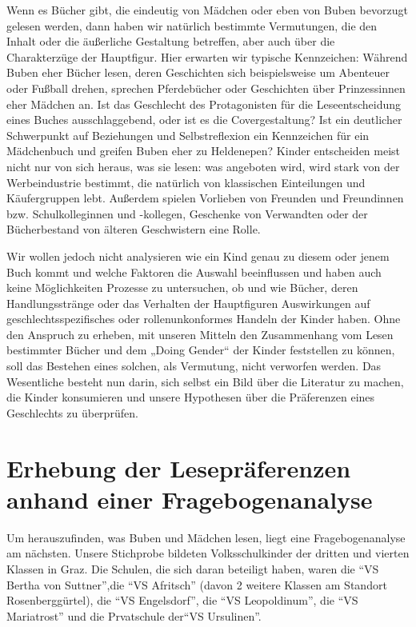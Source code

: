 Wenn es Bücher gibt, die eindeutig von Mädchen oder eben von Buben
bevorzugt gelesen werden, dann haben wir natürlich bestimmte
Vermutungen, die den Inhalt oder die äußerliche Gestaltung betreffen,
aber auch über die Charakterzüge der Hauptfigur. Hier erwarten wir
typische Kennzeichen: Während Buben eher Bücher lesen, deren Geschichten
sich beispielsweise um Abenteuer oder Fußball drehen, sprechen
Pferdebücher oder Geschichten über Prinzessinnen eher Mädchen an. Ist
das Geschlecht des Protagonisten für die Leseentscheidung eines Buches
ausschlaggebend, oder ist es die Covergestaltung? Ist ein deutlicher
Schwerpunkt auf Beziehungen und Selbstreflexion ein Kennzeichen für ein
Mädchenbuch und greifen Buben eher zu Heldenepen? Kinder entscheiden
meist nicht nur von sich heraus, was sie lesen: was angeboten wird, wird
stark von der Werbeindustrie bestimmt, die natürlich von klassischen
Einteilungen und Käufergruppen lebt. Außerdem spielen Vorlieben von
Freunden und Freundinnen bzw. Schulkolleginnen und -kollegen, Geschenke
von Verwandten oder der Bücherbestand von älteren Geschwistern eine
Rolle.

Wir wollen jedoch nicht analysieren wie ein Kind genau zu diesem oder
jenem Buch kommt und welche Faktoren die Auswahl beeinflussen und haben
auch keine Möglichkeiten Prozesse zu untersuchen, ob und wie Bücher,
deren Handlungsstränge oder das Verhalten der Hauptfiguren Auswirkungen
auf geschlechtsspezifisches oder rollenunkonformes Handeln der Kinder
haben. Ohne den Anspruch zu erheben, mit unseren Mitteln den
Zusammenhang vom Lesen bestimmter Bücher und dem „Doing Gender`` der
Kinder feststellen zu können, soll das Bestehen eines solchen, als
Vermutung, nicht verworfen werden. Das Wesentliche besteht nun darin,
sich selbst ein Bild über die Literatur zu machen, die Kinder
konsumieren und unsere Hypothesen über die Präferenzen eines Geschlechts
zu überprüfen.

\section{Erhebung der Lesepräferenzen anhand einer Fragebogenanalyse}

Um herauszufinden, was Buben und Mädchen lesen, liegt eine
Fragebogenanalyse am nächsten. Unsere Stichprobe bildeten
Volksschulkinder der dritten und vierten Klassen in Graz. Die Schulen,
die sich daran beteiligt haben, waren die ``VS Bertha von Suttner'',die
``VS Afritsch'' (davon 2 weitere Klassen am Standort Rosenberggürtel),
die ``VS Engelsdorf'', die ``VS Leopoldinum'', die ``VS Mariatrost'' und
die Prvatschule der``VS Ursulinen''.

